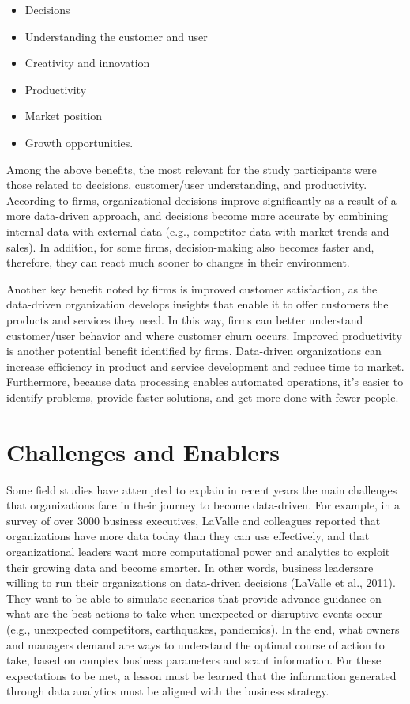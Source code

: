 \documentclass[
  letterpaper,
  DIV=11,
  numbers=noendperiod]{scrreprt}
\begin{document}
\begin{itemize}
\item
  Decisions
\item
  Understanding the customer and user
\item
  Creativity and innovation
\item
  Productivity
\item
  Market position
\item
  Growth opportunities.
\end{itemize}

Among the above benefits, the most relevant for the study participants
were those related to decisions, customer/user understanding, and
productivity. According to firms, organizational decisions improve
significantly as a result of a more data-driven approach, and decisions
become more accurate by combining internal data with external data
(e.g., competitor data with market trends and sales). In addition, for
some firms, decision-making also becomes faster and, therefore, they can
react much sooner to changes in their environment.

Another key benefit noted by firms is improved customer satisfaction, as
the data-driven organization develops insights that enable it to offer
customers the products and services they need. In this way, firms can
better understand customer/user behavior and where customer churn
occurs. Improved productivity is another potential benefit identified by
firms. Data-driven organizations can increase efficiency in product and
service development and reduce time to market. Furthermore, because data
processing enables automated operations, it's easier to identify
problems, provide faster solutions, and get more done with fewer people.

\hypertarget{challenges-and-enablers}{%
\section{Challenges and Enablers}\label{challenges-and-enablers}}

Some field studies have attempted to explain in recent years the main
challenges that organizations face in their journey to become
data-driven. For example, in a survey of over 3000 business executives,
LaValle and colleagues reported that organizations have more data today
than they can use effectively, and that organizational leaders want more
computational power and analytics to exploit their growing data and
become smarter. In other words, business leadersare willing to run their
organizations on data-driven decisions (LaValle et al., 2011). They want
to be able to simulate scenarios that provide advance guidance on what
are the best actions to take when unexpected or disruptive events occur
(e.g., unexpected competitors, earthquakes, pandemics). In the end, what
owners and managers demand are ways to understand the optimal course of
action to take, based on complex business parameters and scant
information. For these expectations to be met, a lesson must be learned
that the information generated through data analytics must be aligned
with the business strategy.
\end{document}
